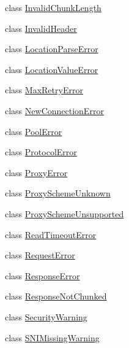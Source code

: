 \begin{DoxyCompactItemize}
\item 
class \hyperlink{classpip_1_1__vendor_1_1urllib3_1_1exceptions_1_1InvalidChunkLength}{Invalid\+Chunk\+Length}
\item 
class \hyperlink{classpip_1_1__vendor_1_1urllib3_1_1exceptions_1_1InvalidHeader}{Invalid\+Header}
\item 
class \hyperlink{classpip_1_1__vendor_1_1urllib3_1_1exceptions_1_1LocationParseError}{Location\+Parse\+Error}
\item 
class \hyperlink{classpip_1_1__vendor_1_1urllib3_1_1exceptions_1_1LocationValueError}{Location\+Value\+Error}
\item 
class \hyperlink{classpip_1_1__vendor_1_1urllib3_1_1exceptions_1_1MaxRetryError}{Max\+Retry\+Error}
\item 
class \hyperlink{classpip_1_1__vendor_1_1urllib3_1_1exceptions_1_1NewConnectionError}{New\+Connection\+Error}
\item 
class \hyperlink{classpip_1_1__vendor_1_1urllib3_1_1exceptions_1_1PoolError}{Pool\+Error}
\item 
class \hyperlink{classpip_1_1__vendor_1_1urllib3_1_1exceptions_1_1ProtocolError}{Protocol\+Error}
\item 
class \hyperlink{classpip_1_1__vendor_1_1urllib3_1_1exceptions_1_1ProxyError}{Proxy\+Error}
\item 
class \hyperlink{classpip_1_1__vendor_1_1urllib3_1_1exceptions_1_1ProxySchemeUnknown}{Proxy\+Scheme\+Unknown}
\item 
class \hyperlink{classpip_1_1__vendor_1_1urllib3_1_1exceptions_1_1ProxySchemeUnsupported}{Proxy\+Scheme\+Unsupported}
\item 
class \hyperlink{classpip_1_1__vendor_1_1urllib3_1_1exceptions_1_1ReadTimeoutError}{Read\+Timeout\+Error}
\item 
class \hyperlink{classpip_1_1__vendor_1_1urllib3_1_1exceptions_1_1RequestError}{Request\+Error}
\item 
class \hyperlink{classpip_1_1__vendor_1_1urllib3_1_1exceptions_1_1ResponseError}{Response\+Error}
\item 
class \hyperlink{classpip_1_1__vendor_1_1urllib3_1_1exceptions_1_1ResponseNotChunked}{Response\+Not\+Chunked}
\item 
class \hyperlink{classpip_1_1__vendor_1_1urllib3_1_1exceptions_1_1SecurityWarning}{Security\+Warning}
\item 
class \hyperlink{classpip_1_1__vendor_1_1urllib3_1_1exceptions_1_1SNIMissingWarning}{S\+N\+I\+Missing\+Warning}
\item 

\end{DoxyCompactItemize}
